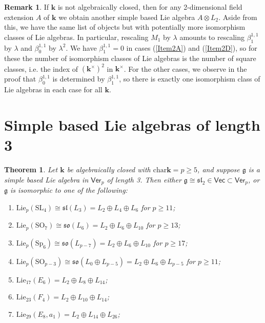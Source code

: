 \documentclass[11pt,a4paper,reqno]{amsart}
\newtheorem{theorem}[subsection]{Theorem}
\theoremstyle{definition}
\newtheorem{remark}[theorem]{Remark}
\newcommand{\bk}{\mathbf{k}}
\numberwithin{equation}{section}
\newcommand{\charr}{\mathrm{char}}
\newcommand{\Ver}{\mathsf{Ver}}
\newcommand{\fg}{\mathfrak{g}}
\newcommand{\fsl}{\mathfrak{sl}}
\newcommand{\fso}{\mathfrak{so}}
\newcommand{\Lie}{\mathrm{Lie}}
\newcommand{\Vecc}{\mathsf{Vec}}
\newcommand{\SL}{\mathrm{SL}}
\newcommand{\SO}{\mathrm{SO}}
\newcommand{\Sp}{\mathrm{Sp}}
\begin{document}
\begin{remark}
If $\bk$ is not algebraically closed, then for any 2-dimensional field extension $A$ of $\bk$ we obtain another simple based Lie algebra $A\otimes L_2$. Aside from this, we have the same list of objects but with potentially more isomorphism classes of Lie algebras. In particular, rescaling $M_1$ by $\lambda$ amounts to rescaling $\beta^{1,1}_1$ by $\lambda$ and $\beta^{1,1}_0$ by $\lambda^2$. We have $\beta^{1,1}_1=0$ in cases (\ref{Item2A}) and (\ref{Item2D}), so for these the number of isomorphism classes of Lie algebras is the number of square classes, i.e. the index of $(\bk^\times)^2$ in $\bk^\times$. For the other cases, we observe in the proof that $\beta^{1,1}_0$ is determined by $\beta^{1,1}_1$, so there is exactly one isomorphism class of Lie algebras in each case for all $\bk$.
\end{remark}



\section{Simple based Lie algebras of length 3}\label{SecLength3}

\begin{theorem}\label{ThmLength3}
Let $\bk$ be algebraically closed with $\charr\bk=p\geq5$, and suppose $\fg$ is a simple based Lie algebra in $\Ver_p$ of length 3. Then either $\fg\cong\fsl_2\in\Vecc\subset\Ver_p$, or $\fg$ is isomorphic to one of the following:
\begin{enumerate}
\item\label{Item3A} $\Lie_p(\SL_4)\cong\fsl(L_3)=L_2\oplus L_4\oplus L_6$ for $p\geq11$;
\item\label{Item3B} $\Lie_p(\SO_7)\cong\fso(L_6)=L_2\oplus L_6\oplus L_{10}$ for $p\geq13$;
\item\label{Item3C} $\Lie_p(\Sp_6)\cong\fso(L_{p-7})=L_2\oplus L_6\oplus L_{10}$ for $p\geq17$;
\item\label{Item3D} $\Lie_p(\SO_{p-3})\cong\fso(L_0\oplus L_{p-5})=L_2\oplus L_6\oplus L_{p-5}$ for $p\geq11$;
\item\label{Item3E6} $\Lie_{17}(E_6)=L_2\oplus L_8\oplus L_{14}$;
\item\label{Item3F4} $\Lie_{23}(F_4)=L_2\oplus L_{10}\oplus L_{14}$;
\item\label{Item3E8} $\Lie_{29}(E_8,a_1)=L_2\oplus L_{14}\oplus L_{26}$;
\end{enumerate}
\end{theorem}
\end{document}
